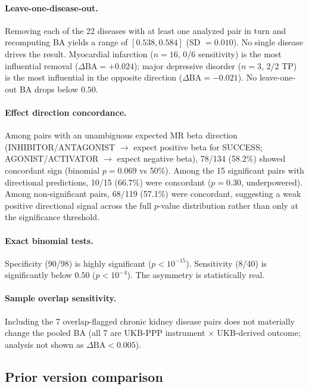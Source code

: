 \documentclass[11pt]{article}
\begin{document}
\paragraph{Leave-one-disease-out.}
Removing each of the 22 diseases with at least one analyzed pair in turn and recomputing BA yields a range of $[0.538, 0.584]$ (SD $= 0.010$). No single disease drives the result. Myocardial infarction ($n = 16$, 0/6 sensitivity) is the most influential removal ($\Delta\text{BA} = +0.024$); major depressive disorder ($n = 3$, 2/2 TP) is the most influential in the opposite direction ($\Delta\text{BA} = -0.021$). No leave-one-out BA drops below $0.50$.

\paragraph{Effect direction concordance.}
Among pairs with an unambiguous expected MR beta direction (INHIBITOR/ANTAGONIST $\rightarrow$ expect positive beta for SUCCESS; AGONIST/ACTIVATOR $\rightarrow$ expect negative beta), 78/134 (58.2\%) showed concordant sign (binomial $p = 0.069$ vs 50\%). Among the 15 significant pairs with directional predictions, 10/15 (66.7\%) were concordant ($p = 0.30$, underpowered). Among non-significant pairs, 68/119 (57.1\%) were concordant, suggesting a weak positive directional signal across the full $p$-value distribution rather than only at the significance threshold.

\paragraph{Exact binomial tests.}
Specificity (90/98) is highly significant ($p < 10^{-15}$). Sensitivity (8/40) is significantly below $0.50$ ($p < 10^{-4}$). The asymmetry is statistically real.

\paragraph{Sample overlap sensitivity.}
Including the 7 overlap-flagged chronic kidney disease pairs does not materially change the pooled BA (all 7 are UKB-PPP instrument $\times$ UKB-derived outcome; analysis not shown as $\Delta\text{BA} < 0.005$).

\subsection{Prior version comparison}
\label{sec:v33}
\end{document}

